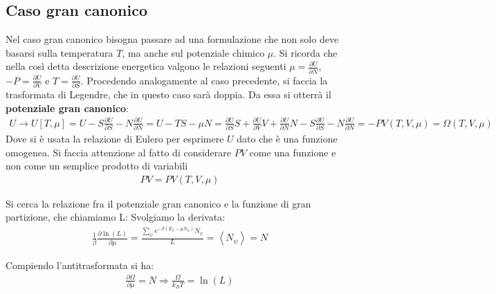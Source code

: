 \subsection{Caso gran canonico} %
Nel caso gran canonico bisogna passare ad una formulazione che non solo deve basarsi sulla temperatura $T$, ma anche sul potenziale chimico $\mu$.
Si ricorda che nella così detta descrizione energetica valgono le relazioni seguenti $\mu=\frac{\partial U}{\partial N}$, $-P=\frac{\partial U}{\partial V}$ e $T=\frac{\partial U}{\partial S}$. 
Procedendo analogamente al caso precedente, si faccia la trasformata di Legendre, che in questo caso sarà doppia. Da essa si otterrà il \textbf{potenziale gran canonico}:
\begin{equation}\begin{split}
U\longrightarrow U\left[T,\mu\right]=U-S\frac{\partial U}{\partial S}-N\frac{\partial U}{\partial N}=U-TS-\mu N=\frac{\partial U}{\partial S}S+\frac{\partial U}{\partial V}V+\frac{\partial U}{\partial N}N-S\frac{\partial U}{\partial S}-N\frac{\partial U}{\partial N}=-PV\left(T,V,\mu\right)=\Omega \left(T,V,\mu\right)
\end{split}\end{equation}
Dove si è usata la relazione di Eulero per esprimere $U$ dato che è una funzione omogenea.
Si faccia attenzione al fatto di considerare $PV$ come una funzione e non come un semplice prodotto di variabili 
\begin{equation}\begin{split}
PV=PV\left(T,V,\mu\right)
\end{split}\end{equation}

Si cerca la relazione fra il potenziale gran canonico e la funzione di gran partizione, che chiamiamo L:
Svolgiamo la derivata:
\begin{equation}\begin{split}
\frac{1}{\beta}\frac{\partial \ln{\left(L\right)}}{\partial \mu}=\frac{\sum_{\psi }{e^{-\beta \left(E_\psi -\mu N_\psi \right)}N_\psi }}{L}=\left\langle N_\psi  \right\rangle=N 
\end{split}\end{equation}

Compiendo l'antitrasformata si ha:
\begin{equation}\begin{split}
\frac{\partial \Omega}{\partial \mu}=N \Longrightarrow \frac{\Omega}{k_BT}=\ln{\left(L\right)}
\end{split}\end{equation}

